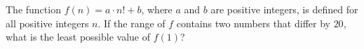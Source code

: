 The function $f(n)=a\cdot n!+b$, where $a$ and $b$ are positive integers, is defined for all positive integers $n$. If the range of $f$ contains two numbers that differ by $20$, what is the least possible value of $f(1)$?
